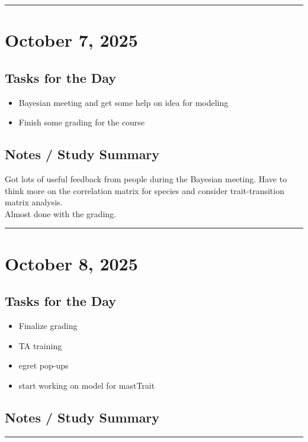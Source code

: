 \documentclass[12pt]{article}
\begin{document}
\vspace{1em}
\hrule
\vspace{1em}

\section*{October 7, 2025}

\subsection*{Tasks for the Day}
\begin{itemize}
    \item Bayesian meeting and get some help on idea for modeling
    \item Finish some grading for the course
\end{itemize}
\subsection*{Notes / Study Summary}
Got lots of useful feedback from people during the Bayesian meeting. Have to think more on the correlation matrix for species and consider trait-transition matrix analysis.\\
Almost done with the grading.

\vspace{1em}
\hrule
\vspace{1em}

\section*{October 8, 2025}

\subsection*{Tasks for the Day}
\begin{itemize}
    \item Finalize grading
    \item TA training
    \item egret pop-ups
    \item start working on model for mastTrait
\end{itemize}
\subsection*{Notes / Study Summary}


\vspace{1em}
\hrule
\vspace{1em}
\end{document}
